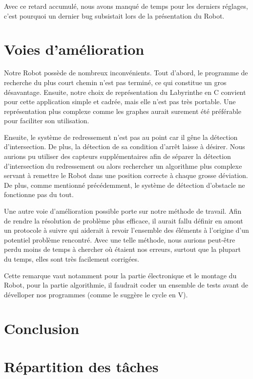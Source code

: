 \documentclass[a4paper,12pt]{article}
\begin{document}
Avec ce retard accumulé, nous avons manqué de temps pour les derniers réglages, c'est pourquoi un dernier bug subsistait lors de la présentation du Robot.\\

\section{Voies d'amélioration}

Notre Robot possède de nombreux inconvénients.
Tout d'abord, le programme de recherche du plus court chemin n'est pas terminé, ce qui constitue un gros désavantage.
Ensuite, notre choix de représentation du Labyrinthe en C convient pour cette application simple et cadrée, mais elle n'est pas très portable.
Une représentation plus complexe comme les graphes aurait surement été préférable pour faciliter son utilisation. 

Ensuite, le système de redressement n'est pas au point car il gêne la détection d'intersection. De plus, la détection de sa condition d'arrêt laisse à désirer.
Nous aurions pu utiliser des capteurs supplémentaires afin de séparer la détection d'intersection du redressement ou alors rechercher un algorithme plus complexe servant à remettre le Robot dans une position correcte à chaque grosse déviation.
De plus, comme mentionné précédemment, le système de détection d'obstacle ne fonctionne pas du tout.

Une autre voie d'amélioration possible porte sur notre méthode de travail.
Afin de rendre la résolution de problème plus efficace, il aurait fallu définir en amont un protocole à suivre qui aiderait à revoir l'ensemble des éléments à l'origine d'un potentiel problème rencontré.
Avec une telle méthode, nous aurions peut-être perdu moins de temps à chercher où étaient nos erreurs, surtout que la plupart du temps, elles sont très facilement corrigées.

Cette remarque vaut notamment pour la partie électronique et le montage du Robot, pour la partie algorithmie, il faudrait coder un ensemble de tests avant de dévelloper nos programmes (comme le suggère le cycle en V).

\section*{Conclusion}
\section{Répartition des tâches}
\end{document}
